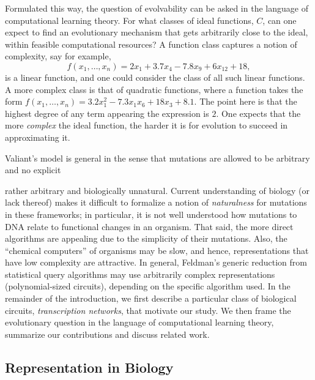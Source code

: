 \documentclass[11pt]{article}
\begin{document}
Formulated this way, the question of evolvability can be asked in the language
of computational learning theory. For what classes of ideal functions, $C$, can
one expect to find an evolutionary mechanism that gets arbitrarily close to the
ideal, within feasible computational resources? A function class captures a
notion of complexity, say for example,
\[ f(x_1, \ldots, x_n) = 2 x_1 + 3.7 x_4 - 7.8 x_9 + 6 x_{12} + 18, \]
is a linear function, and one could consider the class of all such linear
functions. A more complex class is that of quadratic functions, where a function
takes the form $f(x_1, \ldots, x_n) = 3.2 x_1^2 - 7.3 x_1 x_6 + 18 x_3 + 8.1$.
The point here is that the highest degree of any term appearing the expression
is $2$. One expects that the more \emph{complex} the ideal function, the harder
it is for evolution to succeed in approximating it.

Valiant's model is general in the sense that mutations are allowed to be
arbitrary and no explicit 




rather arbitrary and biologically unnatural.
Current understanding of biology (or lack thereof) makes it
difficult to formalize a notion of \emph{naturalness} for mutations in these
frameworks; in particular, it is not well understood how mutations to DNA
relate to functional changes in an organism. That said, the more direct
algorithms are appealing due to the simplicity of their mutations.  Also, the
``chemical computers'' of organisms may be slow, and hence, representations that
have low complexity are attractive.  In general, Feldman's
generic reduction from statistical query algorithms may use arbitrarily complex
representations (polynomial-sized circuits), depending on the specific algorithm
used.  In the remainder of the introduction, we first describe a particular
class of biological circuits, \emph{transcription networks}, that motivate our
study.  We then frame the evolutionary question in the language of computational
learning theory, summarize our contributions and discuss related work.

\subsection*{Representation in Biology}
\end{document}
